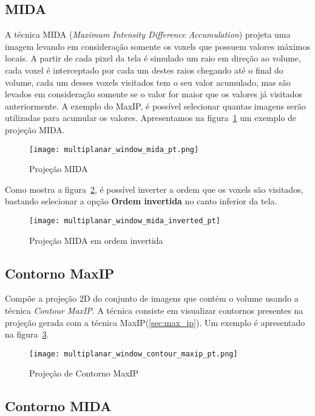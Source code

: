 \subsection{MIDA}
\label{sub:mida}
A técnica MIDA (\textit{Maximum Intensity Difference Accumulation}) projeta uma imagem levando em consideração somente os voxels que possuem valores máximos locais. A partir de cada pixel da tela é simulado um raio em direção ao volume, cada voxel é interceptado por cada um destes raios chegando até o final do volume, cada um desses voxels visitados tem o seu valor acumulado, mas são levados em consideração somente se o valor for maior que os valores já visitados anteriormente. A exemplo do MaxIP, é possível selecionar quantas imagens serão utilizadas para acumular os valores. Apresentamos na figura~\ref{fig:proj_MIDA} um exemplo de projeção MIDA.  

\begin{figure}[H]
\centering
\texttt{[image: multiplanar\_window\_mida\_pt.png]}
\caption{Projeção MIDA}
\label{fig:proj_MIDA}
\end{figure}

Como mostra a figura~\ref{fig:proj_MIDA_inv}, é possível inverter a ordem que os voxels são visitados, bastando selecionar a opção \textbf{Ordem invertida} no canto inferior da tela.

\begin{figure}[H]
\centering
\texttt{[image: multiplanar\_window\_mida\_inverted\_pt]}
\caption{Projeção MIDA em ordem invertida}
\label{fig:proj_MIDA_inv}
\end{figure}

\subsection{Contorno MaxIP}

Compõe a projeção 2D do conjunto de imagens que contém o volume usando a técnica \textit{Contour MaxIP}. A técnica consiste em visualizar contornos presentes na projeção gerada com a técnica MaxIP(\ref{sec:max_ip}). Um exemplo é apresentado na figura~\ref{fig:proj_contorno_maxip}.

\begin{figure}[H]
\centering
\texttt{[image: multiplanar\_window\_contour\_maxip\_pt.png]}
\caption{Projeção de Contorno MaxIP}
\label{fig:proj_contorno_maxip}
\end{figure}

\subsection{Contorno MIDA}

